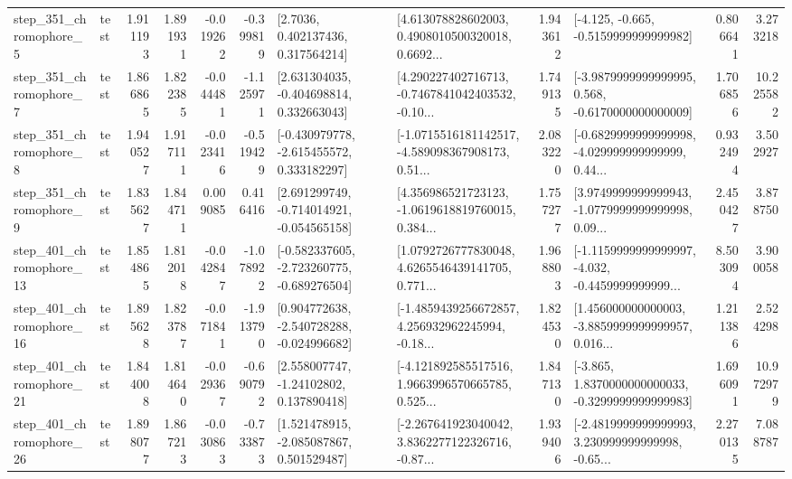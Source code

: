 \begin{tabular}{llrrrrllrlrr}
   step\_351\_chromophore\_5 &      test &      1.911193 &    1.891931 &     -0.019262 & -0.399819 &          [2.7036, 0.402137436, 0.317564214] &  [4.613078828602003, 0.4908010500320018, 0.6692... &       1.943612 &              [-4.125, -0.665, -0.5159999999999982] &            0.806641 &          3.273218 \\
   step\_351\_chromophore\_7 &      test &      1.866865 &    1.822385 &     -0.044481 & -1.125971 &    [2.631304035, -0.404698814, 0.332663043] &  [4.290227402716713, -0.7467841042403532, -0.10... &       1.749135 &  [-3.9879999999999995, 0.568, -0.6170000000000009] &            1.706856 &         10.225582 \\
   step\_351\_chromophore\_8 &      test &      1.940527 &    1.917111 &     -0.023416 & -0.519429 &   [-0.430979778, -2.615455572, 0.333182297] &  [-1.0715516181142517, -4.589098367908173, 0.51... &       2.083220 &  [-0.6829999999999998, -4.029999999999999, 0.44... &            0.932494 &          3.502927 \\
   step\_351\_chromophore\_9 &      test &      1.835627 &    1.844711 &      0.009085 &  0.416416 &   [2.691299749, -0.714014921, -0.054565158] &  [4.356986521723123, -1.0619618819760015, 0.384... &       1.757277 &  [3.9749999999999943, -1.0779999999999998, 0.09... &            2.450427 &          3.878750 \\
  step\_401\_chromophore\_13 &      test &      1.854865 &    1.812018 &     -0.042847 & -1.078922 &  [-0.582337605, -2.723260775, -0.689276504] &  [1.0792726777830048, 4.6265546439141705, 0.771... &       1.968803 &  [-1.1159999999999997, -4.032, -0.4459999999999... &            8.503094 &          3.900058 \\
  step\_401\_chromophore\_16 &      test &      1.895628 &    1.823787 &     -0.071841 & -1.913790 &   [0.904772638, -2.540728288, -0.024996682] &  [-1.4859439256672857, 4.256932962245994, -0.18... &       1.824530 &  [1.456000000000003, -3.8859999999999957, 0.016... &            1.211386 &          2.524298 \\
  step\_401\_chromophore\_21 &      test &      1.844008 &    1.814640 &     -0.029367 & -0.690792 &     [2.558007747, -1.24102802, 0.137890418] &  [-4.121892585517516, 1.9663996570665785, 0.525... &       1.847130 &  [-3.865, 1.8370000000000033, -0.3299999999999983] &            1.696091 &         10.972979 \\
  step\_401\_chromophore\_26 &      test &      1.898077 &    1.867213 &     -0.030863 & -0.733873 &    [1.521478915, -2.085087867, 0.501529487] &  [-2.267641923040042, 3.8362277122326716, -0.87... &       1.939406 &  [-2.4819999999999993, 3.230999999999998, -0.65... &            2.270135 &          7.088787 \\

\end{tabular}
